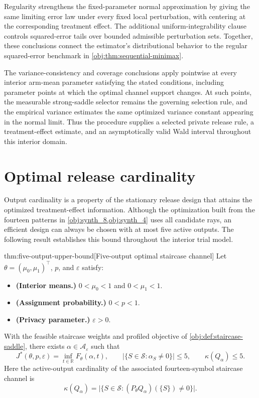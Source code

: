 \documentclass[11pt]{article}
\begin{document}
Regularity strengthens the fixed-parameter normal approximation by giving the same limiting error law under every fixed local perturbation, with centering at the corresponding treatment effect. The additional uniform-integrability clause controls squared-error tails over bounded admissible perturbation sets. Together, these conclusions connect the estimator's distributional behavior to the regular squared-error benchmark in \cref{obj:thm:sequential-minimax}.

The variance-consistency and coverage conclusions apply pointwise at every interior arm-mean parameter satisfying the stated conditions, including parameter points at which the optimal channel support changes. At such points, the measurable strong-saddle selector remains the governing selection rule, and the empirical variance estimates the same optimized variance constant appearing in the normal limit. Thus the procedure supplies a selected private release rule, a treatment-effect estimate, and an asymptotically valid Wald interval throughout this interior domain.


\section{Optimal release cardinality}

Output cardinality is a property of the stationary release design that attains the optimized treatment-effect information. Although the optimization built from the fourteen patterns in \cref{obj:synth_8,obj:synth_4} uses all candidate rays, an efficient design can always be chosen with at most five active outputs. The following result establishes this bound throughout the interior trial model.

\begin{theoremv}{thm:five-output-upper-bound}[Five-output optimal staircase channel]
Let \(\theta=(\mu_0,\mu_1)^\top\), \(p\), and \(\varepsilon\) satisfy:
\begin{itemize}
\item \textbf{(Interior means.)} \(0<\mu_0<1\) and \(0<\mu_1<1\).
\item \textbf{(Assignment probability.)} \(0<p<1\).
\item \textbf{(Privacy parameter.)} \(\varepsilon>0\).
\end{itemize}
With the feasible staircase weights and profiled objective of \cref{obj:def:staircase-saddle}, there exists \(\alpha\in\mathcal A_\varepsilon\) such that
\[
J^*(\theta,p,\varepsilon)
=
\inf_{t\in\mathbb R}F_\theta(\alpha,t),
\qquad
\bigl|\{S\in\mathcal S:\alpha_S\ne0\}\bigr|\le5,
\qquad
\kappa(Q_\alpha)\le5.
\]
Here the active-output cardinality of the associated fourteen-symbol staircase channel is
\[
\kappa(Q_\alpha)
=
\bigl|\{S\in\mathcal S:(P_\theta Q_\alpha)(\{S\})\ne0\}\bigr|.
\]
\end{theoremv}
\end{document}
